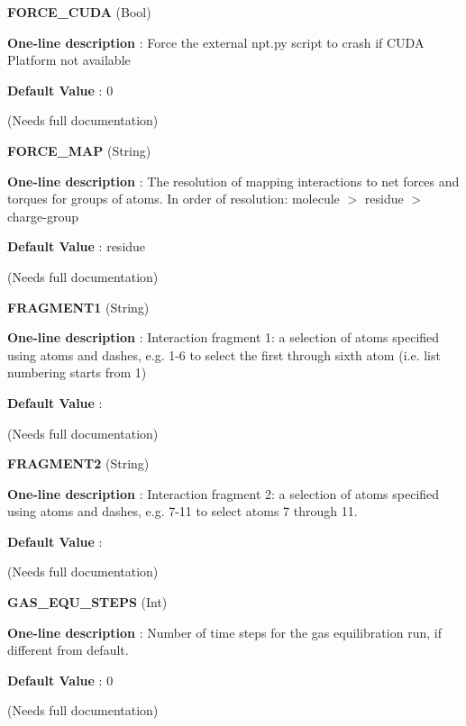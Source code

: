 \begin{DoxyItemize}
\item {\bfseries  F\-O\-R\-C\-E\-\_\-\-C\-U\-D\-A } (Bool) \par
{\bfseries  One-\/line description }\-: Force the external npt.\-py script to crash if C\-U\-D\-A Platform not available \par
{\bfseries  Default Value }\-: 0 \par
(Needs full documentation)\end{DoxyItemize}
\begin{DoxyItemize}
\item {\bfseries  F\-O\-R\-C\-E\-\_\-\-M\-A\-P } (String) \par
{\bfseries  One-\/line description }\-: The resolution of mapping interactions to net forces and torques for groups of atoms. In order of resolution\-: molecule $>$ residue $>$ charge-\/group \par
{\bfseries  Default Value }\-: residue \par
(Needs full documentation)\end{DoxyItemize}
\begin{DoxyItemize}
\item {\bfseries  F\-R\-A\-G\-M\-E\-N\-T1 } (String) \par
{\bfseries  One-\/line description }\-: Interaction fragment 1\-: a selection of atoms specified using atoms and dashes, e.\-g. 1-\/6 to select the first through sixth atom (i.\-e. list numbering starts from 1) \par
{\bfseries  Default Value }\-: \par
(Needs full documentation)\end{DoxyItemize}
\begin{DoxyItemize}
\item {\bfseries  F\-R\-A\-G\-M\-E\-N\-T2 } (String) \par
{\bfseries  One-\/line description }\-: Interaction fragment 2\-: a selection of atoms specified using atoms and dashes, e.\-g. 7-\/11 to select atoms 7 through 11. \par
{\bfseries  Default Value }\-: \par
(Needs full documentation)\end{DoxyItemize}
\begin{DoxyItemize}
\item {\bfseries  G\-A\-S\-\_\-\-E\-Q\-U\-\_\-\-S\-T\-E\-P\-S } (Int) \par
{\bfseries  One-\/line description }\-: Number of time steps for the gas equilibration run, if different from default. \par
{\bfseries  Default Value }\-: 0 \par
(Needs full documentation)\end{DoxyItemize}
